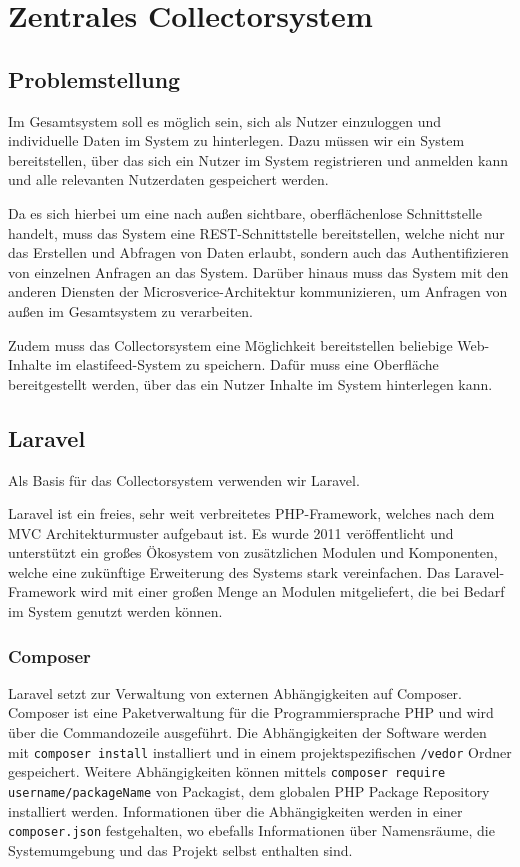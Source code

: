 \chapter{Zentrales Collectorsystem}



\section{Problemstellung}
    Im Gesamtsystem soll es möglich sein, sich als Nutzer einzuloggen und individuelle Daten im System zu hinterlegen.
    Dazu müssen wir ein System bereitstellen, über das sich ein Nutzer im System registrieren und anmelden kann und alle relevanten Nutzerdaten gespeichert werden.
    
    Da es sich hierbei um eine nach außen sichtbare, oberflächenlose Schnittstelle handelt, muss das System eine REST-Schnittstelle bereitstellen, welche nicht nur das Erstellen und Abfragen von Daten erlaubt, sondern auch das Authentifizieren von einzelnen Anfragen an das System. Darüber hinaus muss das System mit den anderen Diensten der Microsverice-Architektur kommunizieren, um Anfragen von außen im Gesamtsystem zu verarbeiten.
    
    Zudem muss das Collectorsystem eine Möglichkeit bereitstellen beliebige Web-Inhalte im elastifeed-System zu speichern. Dafür muss eine Oberfläche bereitgestellt werden, über das ein Nutzer Inhalte im System hinterlegen kann.

\section{Laravel}
    Als Basis für das Collectorsystem verwenden wir Laravel.
    
    Laravel ist ein freies, sehr weit verbreitetes PHP-Framework, welches nach dem MVC Architekturmuster aufgebaut ist. Es wurde 2011 veröffentlicht und unterstützt ein großes Ökosystem von zusätzlichen Modulen und Komponenten, welche eine zukünftige Erweiterung des Systems stark vereinfachen. Das Laravel-Framework wird mit einer großen Menge an Modulen mitgeliefert, die bei Bedarf im System genutzt werden können.
    
    
    \subsection{Composer}
        Laravel setzt zur Verwaltung von externen Abhängigkeiten auf Composer. Composer ist eine Paketverwaltung für die Programmiersprache PHP und wird über die Commandozeile ausgeführt. Die Abhängigkeiten der Software werden mit \texttt{composer install} installiert und in einem projektspezifischen \texttt{/vedor} Ordner gespeichert. Weitere Abhängigkeiten können mittels \texttt{composer require username/packageName} von Packagist, dem globalen PHP Package Repository installiert werden. Informationen über die Abhängigkeiten werden in einer \texttt{composer.json} festgehalten, wo ebefalls Informationen über Namensräume, die Systemumgebung und das Projekt selbst enthalten sind. 
        
